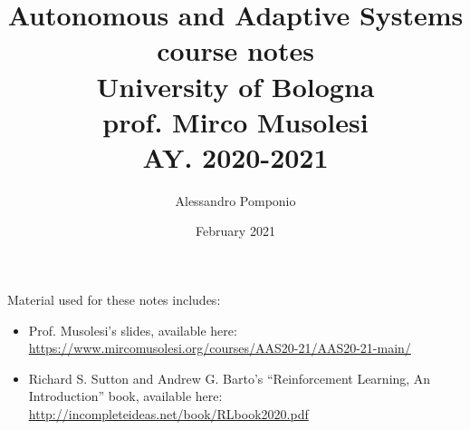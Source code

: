 \documentclass[12pt]{article}
\title{Autonomous and Adaptive Systems \\
        course notes\\
        University of Bologna \\
        \large	 prof. Mirco Musolesi \\
        AY. 2020-2021}
\author{Alessandro Pomponio}
\date{February 2021}
\begin{document}
\maketitle
\clearpage

Material used for these notes includes:
\begin{itemize}
    \item Prof. Musolesi's slides, available here: \url{https://www.mircomusolesi.org/courses/AAS20-21/AAS20-21-main/}
    \item Richard S. Sutton and Andrew G. Barto's ``Reinforcement Learning, An Introduction'' book, available here: \url{http://incompleteideas.net/book/RLbook2020.pdf}
\end{itemize}

\doclicenseThis
\clearpage




\clearpage
\printbibliography
\end{document}
